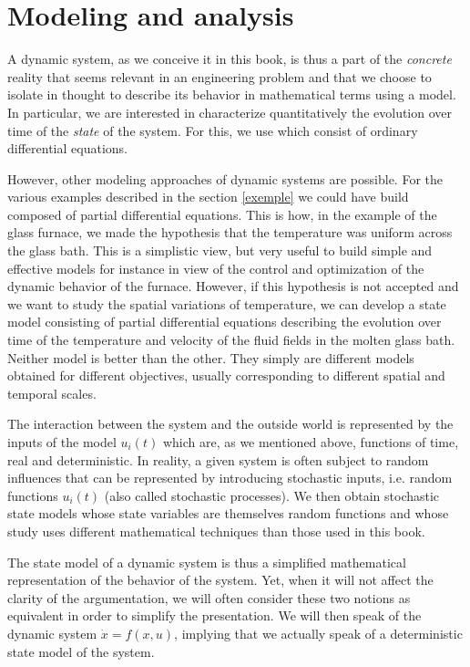 \section{Modeling and analysis}

A dynamic system, as we conceive it in this book, is thus a part of the {\it concrete} reality that seems relevant in an engineering problem and that we choose to isolate in thought to describe its behavior in mathematical terms using a model. In particular, we are interested in characterize quantitatively the evolution over time of the {\it state} of the system. For this, we use  which consist of ordinary differential equations.

However, other modeling approaches of dynamic systems are possible. For the various examples described in the section \ref{exemple} we could have  build  composed of partial differential equations. This is how, in the example of the glass furnace, we made the hypothesis that the temperature was uniform across the glass bath. This is a simplistic view, but very useful to build simple and effective models for instance in view of the control and optimization of the dynamic behavior of the furnace. However, if this hypothesis is not accepted and we want to study the spatial variations of temperature, we can develop a state model consisting of partial differential equations describing the evolution over time of the temperature and velocity of the fluid fields in the molten glass bath. Neither model is better than the other. They simply are different models obtained for different objectives, usually corresponding to different spatial and temporal scales.

The interaction between the system and the \og outside world \gf is represented by the inputs of the model $u_i(t)$ which are, as we mentioned above, functions of time, real and deterministic. In reality, a given system is often subject to random influences that can be represented by introducing stochastic inputs, i.e. random functions $u_i(t) $ (also called stochastic processes). We then obtain stochastic state models whose state variables are themselves random functions and whose study uses different mathematical techniques than those used in this book.

The state model of a dynamic system is thus a simplified mathematical representation of the behavior of the system. Yet, when it will not affect the clarity of the argumentation, we will often consider these two notions as equivalent in order to simplify the presentation. We will then speak of the dynamic system $\dot x = f(x,u)$, implying that we actually speak of a deterministic state model of the system.


